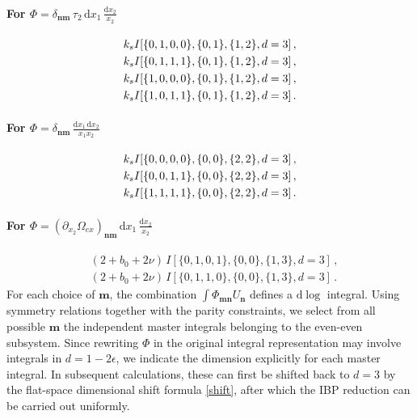 \documentclass[%
 reprint,
 amsmath,amssymb,
 aps,
prd,
]{revtex4-2}
\def\di{{\mathrm{d}}}
\def\ep{\epsilon}
\begin{document}
\paragraph{For $\Phi=\delta_{\bm n\bm m}\,\tau_2\,\di x_1\,\frac{\di x_2}{x_2}$}
\begin{align}
	& k_sI[\{0, 1, 0, 0\}, \{0, 1\}, \{1, 2\}, d=3]\,, \notag\\
	&k_sI[\{0, 1, 1, 1\}, \{0, 1\}, \{1, 2\}, d=3]\,, \nonumber\\
	& k_sI[\{1, 0, 0, 0\}, \{0, 1\}, \{1, 2\}, d=3]\,, \notag\\
	&k_sI[\{1, 0, 1, 1\}, \{0, 1\}, \{1, 2\}, d=3]\,.
\end{align}
\paragraph{For $\Phi=\delta_{\bm n\bm m}\,\frac{\di x_1\,\di x_2}{x_1 x_2}$}
\begin{align}
	& k_sI[\{0, 0, 0, 0\}, \{0, 0\}, \{2, 2\}, d=3]\,, \notag\\
	&k_sI[\{0, 0, 1, 1\}, \{0, 0\}, \{2, 2\}, d=3]\,, \notag\\
 & k_sI[\{1, 1, 1, 1\}, \{0, 0\}, \{2, 2\}, d=3]\,.
\end{align}
\paragraph{For $\Phi=(\partial_{x_2}\Omega_{ex})_{\bm n \bm m}\,\di x_1\,\frac{\di x_2}{x_2}$}
\begin{align}
	& (2 + b_0 + 2\nu)\,I[\{0, 1, 0, 1\}, \{0, 0\}, \{1, 3\}, d=3]\,, \nonumber\\
	& (2 + b_0 + 2\nu)\,I[\{0, 1, 1, 0\}, \{0, 0\}, \{1, 3\}, d=3]\,.
\end{align}
For each choice of \(\bm m\), the combination \(\int \Phi_{\bm m\bm n}U_{\bm n}\) defines a \(\di\log\) integral. Using symmetry relations together with the parity constraints, we select from all possible \(\bm m\) the independent master integrals belonging to the even-even subsystem. Since rewriting \(\Phi\) in the original integral representation may involve integrals in \(d=1-2\ep\), we indicate the dimension explicitly for each master integral. In subsequent calculations, these can first be shifted back to \(d=3\) by the flat-space dimensional shift formula \eqref{shift}, after which the IBP reduction can be carried out uniformly.
\end{document}
